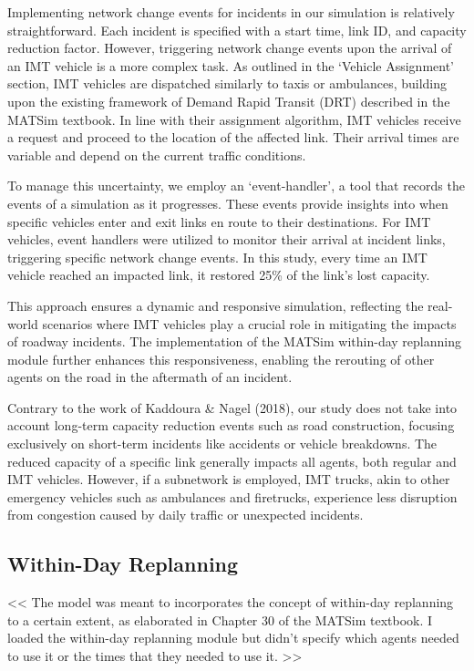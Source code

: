 \documentclass[fancy, oneside, mastersfancy, ms]{byuthesis}
\begin{document}
Implementing network change events for incidents in our simulation is
relatively straightforward. Each incident is specified with a start
time, link ID, and capacity reduction factor. However, triggering
network change events upon the arrival of an IMT vehicle is a more
complex task. As outlined in the `Vehicle Assignment' section, IMT
vehicles are dispatched similarly to taxis or ambulances, building upon
the existing framework of Demand Rapid Transit (DRT) described in the
MATSim textbook. In line with their assignment algorithm, IMT vehicles
receive a request and proceed to the location of the affected link.
Their arrival times are variable and depend on the current traffic
conditions.

To manage this uncertainty, we employ an `event-handler', a tool that
records the events of a simulation as it progresses. These events
provide insights into when specific vehicles enter and exit links en
route to their destinations. For IMT vehicles, event handlers were
utilized to monitor their arrival at incident links, triggering specific
network change events. In this study, every time an IMT vehicle reached
an impacted link, it restored 25\% of the link's lost capacity.

This approach ensures a dynamic and responsive simulation, reflecting
the real-world scenarios where IMT vehicles play a crucial role in
mitigating the impacts of roadway incidents. The implementation of the
MATSim within-day replanning module further enhances this
responsiveness, enabling the rerouting of other agents on the road in
the aftermath of an incident.

Contrary to the work of Kaddoura \& Nagel (2018), our study does not
take into account long-term capacity reduction events such as road
construction, focusing exclusively on short-term incidents like
accidents or vehicle breakdowns. The reduced capacity of a specific link
generally impacts all agents, both regular and IMT vehicles. However, if
a subnetwork is employed, IMT trucks, akin to other emergency vehicles
such as ambulances and firetrucks, experience less disruption from
congestion caused by daily traffic or unexpected incidents.

\hypertarget{within-day-replanning}{%
\subsection{Within-Day Replanning}\label{within-day-replanning}}

\textless\textless{} The model was meant to incorporates the concept of
within-day replanning to a certain extent, as elaborated in Chapter 30
of the MATSim textbook. I loaded the within-day replanning module but
didn't specify which agents needed to use it or the times that they
needed to use it. \textgreater\textgreater{}
\end{document}
